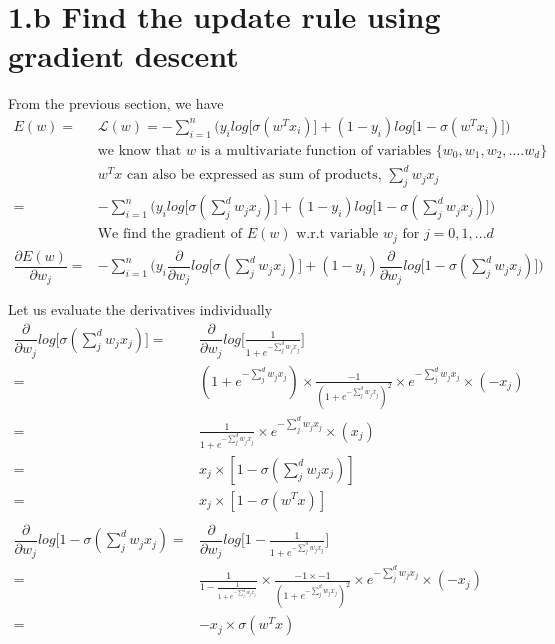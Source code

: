 \documentclass[letterpaper,doc,notimes]{apa6}
\begin{document}
\section{1.b Find the update rule using gradient descent}
From the previous section, we have 
\begin{align*}
	E(w) = & \mathcal{L}(w) = -\sum_{i=1}^{n}\bigg( y_i log\big[ \sigma(w^Tx_i) \big] + (1 - y_i ) log\big[ 1 - \sigma(w^Tx_i) \big]\bigg) \\
	& \text{we know that $w$ is a multivariate function of variables } \{w_0, w_1, w_2, ....w_d\} \\
	&  w^Tx \text{ can also be expressed as sum of products, } \sum_{j}^{d} w_jx_j\\
	= & -\sum_{i=1}^{n}\bigg( y_i log\big[ \sigma(\sum_{j}^{d} w_jx_j) \big] + (1 - y_i ) log\big[ 1 - \sigma(\sum_{j}^{d} w_jx_j) \big]\bigg) \\
	& \text{We find the gradient of $E(w)$ w.r.t variable $w_j$ for $j = 0, 1, ...d $} \\ 
 \dfrac{\partial E(w)}{\partial w_j} = & -\sum_{i=1}^{n} \bigg(
			  y_i \dfrac{\partial}{\partial w_j} log\big[ \sigma(\sum_{j}^{d} w_jx_j) \big] 
			  + (1 - y_i ) \dfrac{\partial}{\partial w_j} log\big[ 1 - \sigma(\sum_{j}^{d} w_jx_j) 
		\big]\bigg) \\ 
		\\
\end{align*}
Let us evaluate the derivatives individually
\begin{align*}
\dfrac{\partial}{\partial w_j} log\big[ \sigma(\sum_{j}^{d} w_jx_j) \big]  = &
		 \dfrac{\partial}{\partial w_j} log\big[  \frac{1}{1 + e^{-\sum_{j}^{d} w_jx_j} } \big]\\
	= &  (1 + e^{-\sum_{j}^{d} w_jx_j}) \times \frac{-1}{(1 + e^{-\sum_{j}^{d} w_jx_j})^2} \times e^{-\sum_{j}^{d} w_jx_j} \times (-x_j) \\
	= &  \frac{1}{1 + e^{-\sum_{j}^{d} w_jx_j}} \times e^{-\sum_{j}^{d} w_jx_j} \times (x_j) \\
	= & x_j \times [1 - \sigma(\sum_{j}^{d} w_jx_j)] \\
	= & x_j \times [1 - \sigma(w^Tx)] \\
	\\
\dfrac{\partial}{\partial w_j} log\big[ 1 - \sigma(\sum_{j}^{d} w_jx_j) = &
	\dfrac{\partial}{\partial w_j} log\big[ 1 - \frac{1}{1 + e^{-\sum_{j}^{d} w_jx_j} } \big] \\
	= &  \frac{1}{1 - \frac{1}{1 + e^{-\sum_{j}^{d} w_jx_j}}} \times \frac{-1 \times -1 }{(1 + e^{-\sum_{j}^{d} w_jx_j})^2} \times e^{-\sum_{j}^{d} w_jx_j} \times (-x_j) \\
	= & -x_j \times \sigma(w^Tx) \\ 
\end{align*}
\end{document}
